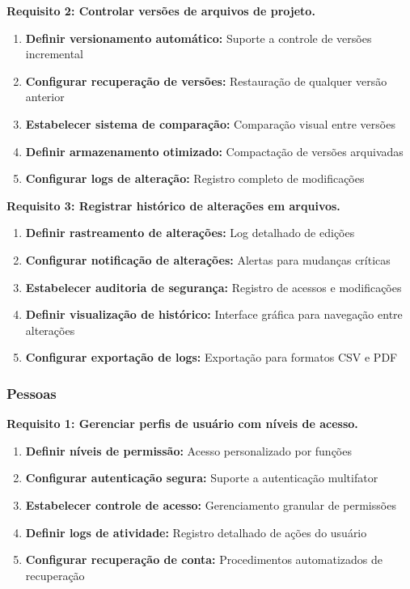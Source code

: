 \textbf{Requisito 2: Controlar versões de arquivos de projeto.}
\begin{enumerate}[leftmargin=*]
    \item \textbf{Definir versionamento automático:} Suporte a controle de versões incremental
    \item \textbf{Configurar recuperação de versões:} Restauração de qualquer versão anterior
    \item \textbf{Estabelecer sistema de comparação:} Comparação visual entre versões
    \item \textbf{Definir armazenamento otimizado:} Compactação de versões arquivadas
    \item \textbf{Configurar logs de alteração:} Registro completo de modificações
\end{enumerate}

\textbf{Requisito 3: Registrar histórico de alterações em arquivos.}
\begin{enumerate}[leftmargin=*]
    \item \textbf{Definir rastreamento de alterações:} Log detalhado de edições
    \item \textbf{Configurar notificação de alterações:} Alertas para mudanças críticas
    \item \textbf{Estabelecer auditoria de segurança:} Registro de acessos e modificações
    \item \textbf{Definir visualização de histórico:} Interface gráfica para navegação entre alterações
    \item \textbf{Configurar exportação de logs:} Exportação para formatos CSV e PDF
\end{enumerate}

\subsubsection{Pessoas}
\textbf{Requisito 1: Gerenciar perfis de usuário com níveis de acesso.}
\begin{enumerate}[leftmargin=*]
    \item \textbf{Definir níveis de permissão:} Acesso personalizado por funções
    \item \textbf{Configurar autenticação segura:} Suporte a autenticação multifator
    \item \textbf{Estabelecer controle de acesso:} Gerenciamento granular de permissões
    \item \textbf{Definir logs de atividade:} Registro detalhado de ações do usuário
    \item \textbf{Configurar recuperação de conta:} Procedimentos automatizados de recuperação
\end{enumerate}

